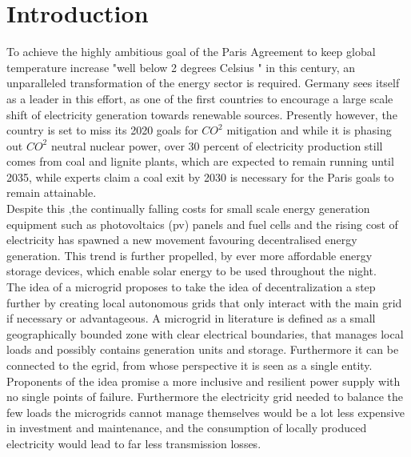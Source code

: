 \documentclass[
	11pt,								%
	DIV10,								%
	a4paper,         					%
	oneside,							%
	headheight=20pt,					%
	footheight=20pt,					%
    parskip=full,						%
    listof=totoc,						%
	bibliography=totoc,					%
	index=totoc,						%
]{scrartcl}
\begin{document}



\section{Introduction}
To achieve the highly ambitious goal of the Paris Agreement to keep global temperature increase "well below 2 degrees Celsius " in this century, an unparalleled transformation of the energy sector is required. Germany sees itself as a leader in this effort, as one of the first countries to encourage a large scale shift of electricity generation towards renewable sources. Presently however, the country is set to miss its 2020 goals for $CO^2$ mitigation   and while it is phasing out $CO^2$ neutral nuclear power, over 30 percent of electricity production still comes from coal and lignite plants, which are expected to remain running until 2035, while experts claim a coal exit by 2030 is necessary for the Paris goals to remain attainable.
\\
Despite this ,the continually falling costs for small scale energy generation equipment such as photovoltaics (pv) panels and fuel cells and the rising cost of electricity has spawned a new movement favouring decentralised energy generation. This trend is further propelled, by ever more affordable energy storage devices, which enable solar energy to be used throughout the night.
\\
The idea of a microgrid proposes to take the idea of decentralization a step further by creating local autonomous grids that only interact with the main grid if necessary or advantageous.
A microgrid in literature is defined as a small geographically bounded zone with clear electrical boundaries, that manages local loads and possibly contains generation units and storage. Furthermore it can be connected to the egrid, from whose perspective it is seen as a single entity. \\
Proponents of the idea promise a more inclusive and resilient power supply with no single points of failure. Furthermore the electricity grid needed to balance the few loads the microgrids cannot manage themselves would be a lot less expensive in investment and maintenance, and the consumption of locally produced electricity would lead to far less transmission losses.
\end{document}
